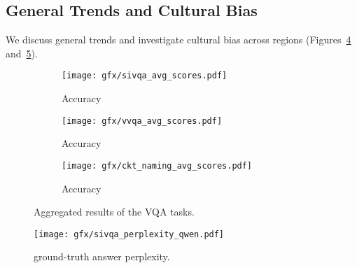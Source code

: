 \subsection{General Trends and Cultural Bias}
\label{sec:analyses:a1_bias}
%
We discuss general trends and investigate cultural bias across regions (Figures~\ref{fig:analyses:a1_bias:scores} and~\ref{fig:analyses:a1_bias:ppl}). %
%

\begin{figure}[t]
     \begin{subfigure}{1.\linewidth}
        \centering
        \texttt{[image: gfx/sivqa\_avg\_scores.pdf]}
        \caption{\sivqa Accuracy}
        \label{fig:analyses:a1_bias:scores:sivqa}
    \end{subfigure}

    \begin{subfigure}{1.\linewidth} 
        \centering
        \texttt{[image: gfx/vvqa\_avg\_scores.pdf]}
        \caption{\vvqa Accuracy}
        \label{fig:analyses:a1_bias:scores:vvqa}
    \end{subfigure}

    \begin{subfigure}{1.\linewidth}
        \centering
        \texttt{[image: gfx/ckt\_naming\_avg\_scores.pdf]}
        \caption{\ckqan Accuracy}
        \label{fig:analyses:a1_bias:ckqa-name}
    \end{subfigure}
    \caption{Aggregated results of the VQA tasks.}
    \label{fig:analyses:a1_bias:scores}
\end{figure}
%
%
\begin{figure}[t]
    \centering
    \texttt{[image: gfx/sivqa\_perplexity\_qwen.pdf]}
    \caption{\sivqa ground-truth answer perplexity.}
    \label{fig:analyses:a1_bias:ppl}
\end{figure}

